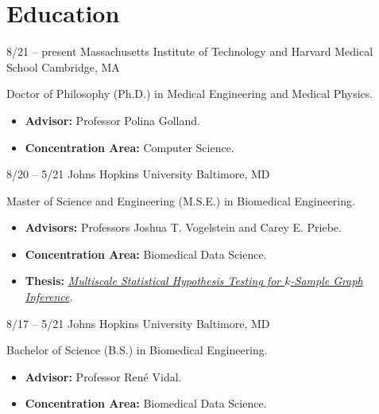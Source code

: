 \section{Education}

\cventry
{8/21 -- present}
{Massachusetts Institute of Technology and Harvard Medical School}
{}
{Cambridge, MA}
{}
{
Doctor of Philosophy (Ph.D.) in Medical Engineering and Medical Physics.
\begin{itemize}
    \item \textbf{Advisor:} Professor Polina Golland.
    \item \textbf{Concentration Area:} Computer Science.
\end{itemize}
}


\cventry
{8/20 -- 5/21}
{Johns Hopkins University}
{}
{Baltimore, MD}
{}
{
Master of Science and Engineering (M.S.E.) in Biomedical Engineering.
\begin{itemize}
    \item \textbf{Advisors:} Professors Joshua T. Vogelstein and Carey E. Priebe.
    \item \textbf{Concentration Area:} Biomedical Data Science.
    \item \textbf{Thesis:} \textit{\href{https://jscholarship.library.jhu.edu/handle/1774.2/64239}{Multiscale Statistical Hypothesis Testing for $k$-Sample Graph Inference}}.
\end{itemize}
}

\cventry
{8/17 -- 5/21}
{Johns Hopkins University}
{}
{Baltimore, MD}
{}
{
Bachelor of Science (B.S.) in Biomedical Engineering.
\begin{itemize}
    \item \textbf{Advisor:} Professor Ren\'{e} Vidal.
    \item \textbf{Concentration Area:} Biomedical Data Science.
\end{itemize}
}
